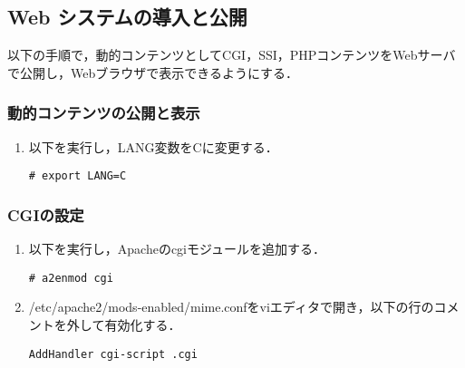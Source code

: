 \documentclass[a4j,titlepage]{jarticle}
\begin{document}
\begin{itemize}
\begin{itemize}
\begin{itemize}
\end{itemize}

\end{itemize}


\subsection{Web システムの導入と公開}
以下の手順で，動的コンテンツとしてCGI，SSI，PHPコンテンツをWebサーバで公開し，Webブラウザで表示できるようにする．

\subsubsection{動的コンテンツの公開と表示}
\begin{enumerate}
\item 以下を実行し，LANG変数をCに変更する．
\begin{screen}
\begin{center}
\begin{verbatim}
# export LANG=C
\end{verbatim}
\end{center}
\end{screen}

\end{enumerate}

\subsubsection{CGIの設定}
\begin{enumerate}
\item 以下を実行し，Apacheのcgiモジュールを追加する．
\begin{screen}
\begin{center}
\begin{verbatim}
# a2enmod cgi
\end{verbatim}
\end{center}
\end{screen}

\item /etc/apache2/mods-enabled/mime.confをviエディタで開き，以下の行のコメントを外して有効化する．
\begin{screen}
\begin{center}
\begin{verbatim}
AddHandler cgi-script .cgi
\end{verbatim}
\end{center}
\end{screen}


\end{enumerate}
\end{itemize}
\end{document}
